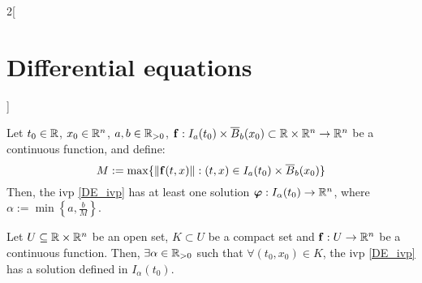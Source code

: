 \documentclass[../../../main.tex]{subfiles}
\begin{document}
\begin{multicols}{2}[\section{Differential equations}]
\begin{corollary}
  \end{corollary}
  \begin{theorem}
    Let $t_0\in\mathbb{R}$, $x_0\in\mathbb{R}^n$, $a,b\in\mathbb{R}_{>0}$, $\boldsymbol{\mathrm{f}}:I_a(t_0)\times\overline{B}_{b}(x_0)\subset\mathbb{R}\times\mathbb{R}^n\rightarrow\mathbb{R}^n$ be a continuous function, and define: $$M:=\max\{\|\boldsymbol{\mathrm{f}}(t,x)\|:(t,x)\in I_a(t_0)\times\overline{B}_{b}(x_0)\}$$ Then, the ivp \eqref{DE_ivp} has at least one solution $\boldsymbol{\mathrm{\varphi}}:I_\alpha(t_0)\rightarrow\mathbb{R}^n$, where $\alpha:=\min\left\{a,\frac{b}{M}\right\}$.
  \end{theorem}
  \begin{corollary}
    Let $U\subseteq\mathbb{R}\times\mathbb{R}^n$ be an open set, $K\subset U$ be a compact set and $\boldsymbol{\mathrm{f}}:U\rightarrow\mathbb{R}^n$ be a continuous function. Then, $\exists\alpha\in\mathbb{R}_{>0}$ such that $\forall (t_0,x_0)\in K$, the ivp \eqref{DE_ivp} has a solution defined in $I_\alpha(t_0)$.
  \end{corollary}

\end{multicols}
\end{document}
